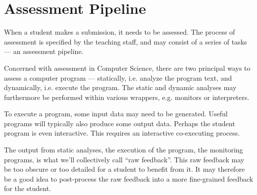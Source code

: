 
\chapter{Assessment Pipeline}

When a student makes a submission, it needs to be assessed. The process of
assessment is specified by the teaching staff, and may consist of a series of
tasks --- an assessment pipeline.

Concerned with assessment in Computer Science, there are two principal ways to
assess a computer program --- statically, i.e. analyze the program text, and
dynamically, i.e. execute the program. The static and dynamic analyses may
furthermore be performed within various wrappers, e.g. monitors or
interpreters.

To execute a program, some input data may need to be generated. Useful programs
will typically also produce some output data. Perhaps the student program is
even interactive. This requires an interactive co-executing process.

The output from static analyses, the execution of the program, the monitoring
programs, is what we'll collectively call ``raw feedback''. This raw feedback
may be too obscure or too detailed for a student to benefit from it. It may
therefore be a good idea to post-process the raw feedback into a more
fine-grained feedback for the student.
